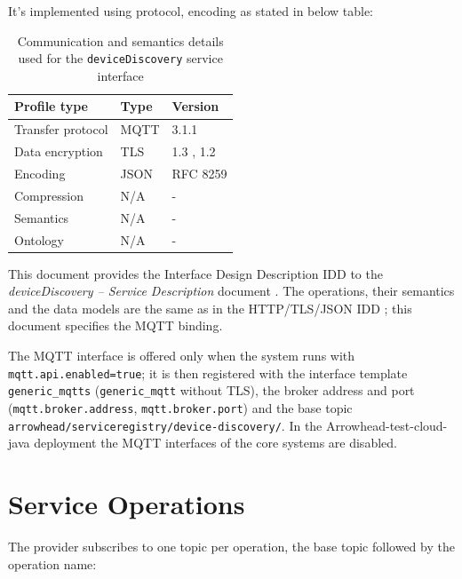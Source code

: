 \documentclass[a4paper]{arrowhead}
\begin{document}
It's implemented using protocol, encoding as stated in below table:
\begin{table}[ht!]
  \centering
  \begin{tabular}{|l|l|l|}
    \hline
    \rowcolor{gray!33} Profile type & Type & Version \\ \hline
    Transfer protocol & MQTT & 3.1.1 \cite{mqtt311} \\ \hline
    Data encryption & TLS & 1.3 \cite{rfc8446}, 1.2 \cite{rfc5246} \\ \hline
    Encoding & JSON & RFC 8259 \cite{rfc8259} \\ \hline
    Compression & N/A & - \\ \hline
    Semantics & N/A & - \\ \hline
    Ontology & N/A & - \\ \hline
  \end{tabular}
  \caption{Communication and semantics details used for the \texttt{deviceDiscovery} service interface}
  \label{tab:comunication_semantics_profile}
\end{table}

This document provides the Interface Design Description IDD to the \textit{deviceDiscovery -- Service Description} document \cite{sr-deviceDiscovery-sd}.
The operations, their semantics and the data models are the same as in the HTTP/TLS/JSON IDD \cite{sr-deviceDiscovery-http-idd}; this document specifies the MQTT binding.

The MQTT interface is offered only when the system runs with \texttt{mqtt.api.enabled=true}; it is then registered with the interface template \texttt{generic\_\allowbreak{}mqtts} (\texttt{generic\_\allowbreak{}mqtt} without TLS), the broker address and port (\texttt{mqtt.\allowbreak{}broker.\allowbreak{}address}, \texttt{mqtt.\allowbreak{}broker.\allowbreak{}port}) and the base topic \texttt{arrowhead/\allowbreak{}serviceregistry/\allowbreak{}device-\allowbreak{}discovery/\allowbreak{}}. In the Arrowhead-test-cloud-java deployment the MQTT interfaces of the core systems are disabled.

\newpage

\section{Service Operations}
\label{sec:operations}

The provider subscribes to one topic per operation, the base topic followed by the operation name:
\end{document}
